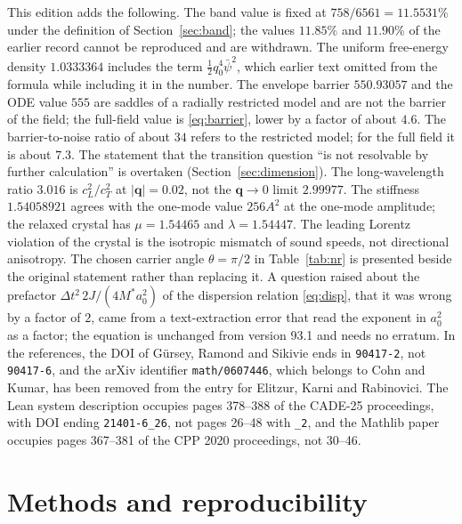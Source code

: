 \documentclass[a4paper,11pt]{article}
\numberwithin{equation}{section}
\theoremstyle{jsplain}
\theoremstyle{jsrem}
\begin{document}
This edition adds the following. The band value is fixed at $758/6561=11.5531\%$ under the definition of Section~\ref{sec:band}; the values $11.85\%$ and $11.90\%$ of the earlier record cannot be reproduced and are withdrawn. The uniform free-energy density $1.0333364$ includes the term $\tfrac12q_0^4\bar\psi^2$, which earlier text omitted from the formula while including it in the number. The envelope barrier $550.93057$ and the ODE value $555$ are saddles of a radially restricted model and are not the barrier of the field; the full-field value is \eqref{eq:barrier}, lower by a factor of about $4.6$. The barrier-to-noise ratio of about $34$ refers to the restricted model; for the full field it is about $7.3$. The statement that the transition question ``is not resolvable by further calculation'' is overtaken (Section~\ref{sec:dimension}). The long-wavelength ratio $3.016$ is $c_L^2/c_T^2$ at $|\mathbf{q}|=0.02$, not the $\mathbf{q}\to0$ limit $2.99977$. The stiffness $1.54058921$ agrees with the one-mode value $256A^2$ at the one-mode amplitude; the relaxed crystal has $\mu=1.54465$ and $\lambda=1.54447$. The leading Lorentz violation of the crystal is the isotropic mismatch of sound speeds, not directional anisotropy. The chosen carrier angle $\theta=\pi/2$ in Table~\ref{tab:nr} is presented beside the original statement rather than replacing it. A question raised about the prefactor $\Delta t^2\,2J/(4M^*a_0^2)$ of the dispersion relation \eqref{eq:disp}, that it was wrong by a factor of $2$, came from a text-extraction error that read the exponent in $a_0^2$ as a factor; the equation is unchanged from version 93.1 and needs no erratum. In the references, the DOI of Gürsey, Ramond and Sikivie ends in \texttt{90417-2}, not \texttt{90417-6}, and the arXiv identifier \texttt{math/0607446}, which belongs to Cohn and Kumar, has been removed from the entry for Elitzur, Karni and Rabinovici. The Lean system description occupies pages 378--388 of the CADE-25 proceedings, with DOI ending \texttt{21401-6\_26}, not pages 26--48 with \texttt{\_2}, and the Mathlib paper occupies pages 367--381 of the CPP 2020 proceedings, not 30--46.

\section{Methods and reproducibility}\label{app:methods}
\end{document}

